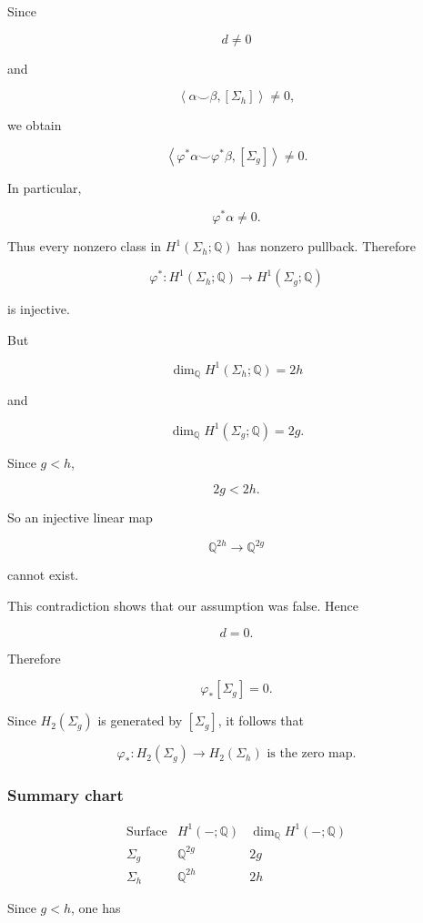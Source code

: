 \documentclass[12pt,a4paper]{article}
\theoremstyle{notespace}
\begin{document}
Since

\[
d\neq 0
\]

and

\[
\left\langle \alpha\smile \beta,[\Sigma_h]\right\rangle\neq 0,
\]

we obtain

\[
\left\langle \varphi^*\alpha\smile \varphi^*\beta,[\Sigma_g]\right\rangle\neq 0.
\]

In particular,

\[
\varphi^*\alpha\neq 0.
\]

Thus every nonzero class in \(H^1(\Sigma_h;\mathbb Q)\) has nonzero pullback. Therefore

\[
\varphi^*:H^1(\Sigma_h;\mathbb Q)\to H^1(\Sigma_g;\mathbb Q)
\]

is injective.

But

\[
\dim_{\mathbb Q}H^1(\Sigma_h;\mathbb Q)=2h
\]

and

\[
\dim_{\mathbb Q}H^1(\Sigma_g;\mathbb Q)=2g.
\]

Since \(g<h\),

\[
2g<2h.
\]

So an injective linear map

\[
\mathbb Q^{2h}\longrightarrow \mathbb Q^{2g}
\]

cannot exist.

This contradiction shows that our assumption was false. Hence

\[
d=0.
\]

Therefore

\[
\varphi_*[\Sigma_g]=0.
\]

Since \(H_2(\Sigma_g)\) is generated by \([\Sigma_g]\), it follows that

\[
\boxed{
	\varphi_*:H_2(\Sigma_g)\longrightarrow H_2(\Sigma_h)
	\text{ is the zero map.}
}
\]

\subsubsection*{Summary chart}

\[
\begin{array}{c|c|c}
	\text{Surface} & H^1(-;\mathbb Q) & \dim_{\mathbb Q}H^1(-;\mathbb Q) \\
	\hline
	\Sigma_g & \mathbb Q^{2g} & 2g \\
	\Sigma_h & \mathbb Q^{2h} & 2h
\end{array}
\]

Since \(g<h\), one has
\end{document}
